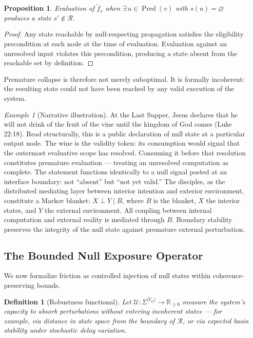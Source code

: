 \documentclass[11pt]{article}
\newtheorem{definition}{Definition}
\newtheorem{proposition}{Proposition}
\theoremstyle{remark}
\newtheorem*{example*}{Example}
\begin{document}
\begin{proposition}
Evaluation of $\tilde{f}_v$ when $\exists\, u \in \operatorname{Pred}(v)$ with $s(u) = \varnothing$ produces a state $s' \notin \mathcal{R}$.
\end{proposition}

\begin{proof}
Any state reachable by null-respecting propagation satisfies the eligibility precondition at each node at the time of evaluation. Evaluation against an unresolved input violates this precondition, producing a state absent from the reachable set by definition.
\end{proof}

Premature collapse is therefore not merely suboptimal. It is formally incoherent: the resulting state could not have been reached by any valid execution of the system.

\begin{example*}[Narrative illustration]
At the Last Supper, Jesus declares that he will not drink of the fruit of the vine until the kingdom of God comes (Luke 22:18). Read structurally, this is a public declaration of null state at a particular output node. The wine is the validity token: its consumption would signal that the outermost evaluative scope has resolved. Consuming it before that resolution constitutes premature evaluation --- treating an unresolved computation as complete. The statement functions identically to a null signal posted at an interface boundary: not ``absent'' but ``not yet valid.'' The disciples, as the distributed mediating layer between interior intention and exterior environment, constitute a Markov blanket: $X \perp Y \mid B$, where $B$ is the blanket, $X$ the interior states, and $Y$ the external environment. All coupling between internal computation and external reality is mediated through $B$. Boundary stability preserves the integrity of the null state against premature external perturbation.
\end{example*}

\subsection{The Bounded Null Exposure Operator}

We now formalize friction as controlled injection of null states within coherence-preserving bounds.

\begin{definition}[Robustness functional]
Let $\mathcal{U} : \Sigma^{|V_G|} \to \mathbb{R}_{\geq 0}$ measure the system's capacity to absorb perturbations without entering incoherent states --- for example, via distance in state space from the boundary of $\mathcal{R}$, or via expected basin stability under stochastic delay variation.
\end{definition}
\end{document}

